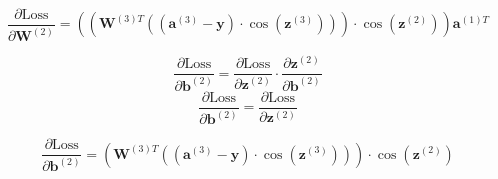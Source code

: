 \begin{enumerate}[label=\textbf{\roman*.}]
  \begin{equation}
  \frac{\partial \text{Loss}}{\partial \mathbf{W}^{(2)}} = \left(\left(\mathbf{W}^{(3)T} \left((\mathbf{a}^{(3)} - \mathbf{y}) \cdot \cos(\mathbf{z}^{(3)})\right)\right) \cdot \cos(\mathbf{z}^{(2)})\right) \mathbf{a}^{(1)T}
  \end{equation}
 

   \[
  \frac{\partial \text{Loss}}{\partial \mathbf{b}^{(2)}} = \frac{\partial \text{Loss}}{\partial \mathbf{z}^{(2)}} \cdot \frac{\partial \mathbf{z}^{(2)}}{\partial \mathbf{b}^{(2)}}
  \]
  \[
  \frac{\partial \text{Loss}}{\partial \mathbf{b}^{(2)}} = \frac{\partial \text{Loss}}{\partial \mathbf{z}^{(2)}}
  \]

  \begin{equation}
  \frac{\partial \text{Loss}}{\partial \mathbf{b}^{(2)}} = \left(\mathbf{W}^{(3)T} \left((\mathbf{a}^{(3)} - \mathbf{y}) \cdot \cos(\mathbf{z}^{(3)})\right)\right) \cdot \cos(\mathbf{z}^{(2)})
  \end{equation}
\end{enumerate}

